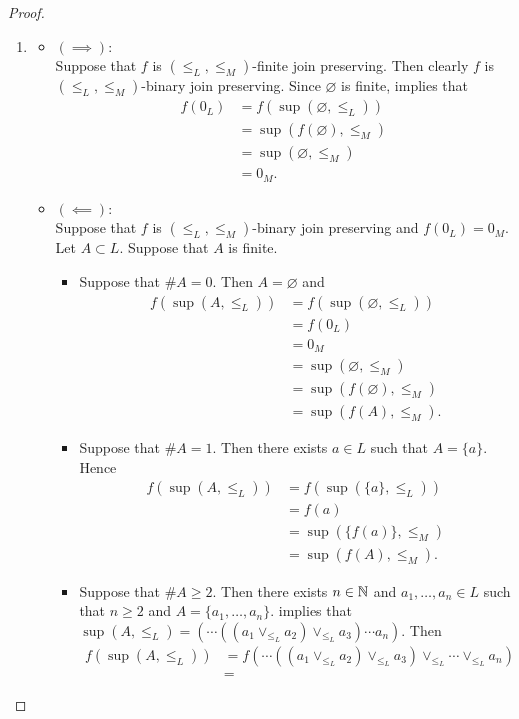 \documentclass{book}
\begin{document}
	\begin{proof}\
		\begin{enumerate}
			\item 
			\begin{itemize}
				\item $(\implies)$: \\
				Suppose that $f$ is $(\leq_L, \leq_M)$-finite join preserving. Then clearly $f$ is $(\leq_L, \leq_M)$-binary join preserving. Since $\varnothing$ is finite,  implies that
				\begin{align*}
					f(0_L)
					& = f(\sup (\varnothing, \leq_L)) \\
					& = \sup (f(\varnothing), \leq_M) \\
					& = \sup (\varnothing, \leq_M) \\
					& = 0_M.
				\end{align*} 
				\item $(\impliedby)$: \\
				Suppose that $f$ is $(\leq_L, \leq_M)$-binary join preserving and $f(0_L) = 0_M$. Let $A \subset L$. Suppose that $A$ is finite. 
				\begin{itemize}
					\item Suppose that $\#A = 0$. Then $A = \varnothing$ and 
					\begin{align*}
						f(\sup (A, \leq_L)) 
						& = f(\sup (\varnothing, \leq_L)) \\
						& = f(0_L) \\
						& = 0_M \\
						& = \sup (\varnothing, \leq_M) \\
						& = \sup (f(\varnothing), \leq_M) \\
						& = \sup (f(A), \leq_M).
					\end{align*}
					\item Suppose that $\# A = 1$. Then there exists $a \in L$ such that $A = \{a\}$. Hence 
					\begin{align*}
						f(\sup (A, \leq_L)) 
						& = f(\sup (\{a\}, \leq_L)) \\
						& = f(a) \\
						& = \sup(\{f(a)\}, \leq_M) \\
						& = \sup (f(A), \leq_M).
					\end{align*}
					\item Suppose that $\# A \geq 2$. Then there exists $n \in \mathbb{N}$ and $a_1, \ldots, a_n \in L$ such that $n \geq 2$ and $A = \{a_1, \ldots, a_n\}$.  implies that $\sup (A, \leq_L) = (\cdots ((a_1 \vee_{\leq_L} a_2) \vee_{\leq_L} a_3) \cdots a_n)$. Then 
					\begin{align*}
						f(\sup (A, \leq_L))
						& = f(\cdots ((a_1 \vee_{\leq_L} a_2) \vee_{\leq_L} a_3) \vee_{\leq_L}\cdots \vee_{\leq_L} a_n) \\
						& = 
					\end{align*}
					

\end{itemize}
\end{itemize}
\end{enumerate}
\end{proof}
\end{document}
